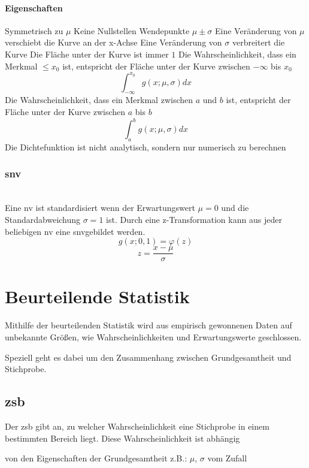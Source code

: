 \documentclass{school}
\begin{document}
\paragraph{Eigenschaften}
\begin{outline}
\1 Symmetrisch zu $\mu$
\1 Keine Nullstellen
 Wendepunkte \quad $\mu \pm \sigma$
\1 Eine Veränderung von $\mu$ verschiebt die Kurve an der x-Achse
\1 Eine Veränderung von $\sigma$ verbreitert die Kurve
\1 Die Fläche unter der Kurve ist immer $1$
\1 Die Wahrscheinlichkeit, dass ein Merkmal $\leqslant x_0$ ist, entspricht der Fläche unter der Kurve zwischen $-\infty$ bis $x_0$
$$\int_{-\infty}^{x_0}g(x;\mu,\sigma)dx$$
\1 Die Wahrscheinlichkeit, dass ein Merkmal zwischen $a$ und $b$ ist, entspricht der Fläche unter der Kurve zwischen $a$ bis $b$
$$\int_{a}^{b}g(x;\mu,\sigma)dx$$
\1 Die Dichtefunktion ist nicht analytisch, sondern nur numerisch zu berechnen
\end{outline}

\subsubsection{\gls{snv}}~\\
Eine \gls{nv} ist standardisiert wenn der Erwartungswert $\mu = 0$ und die Standardabweichung $\sigma = 1$ ist. Durch eine z-Transformation kann aus jeder beliebigen \gls{nv} eine \gls{snv}gebildet werden.
$$g(x;0,1) = \varphi(z)$$
$$z = \frac{x-\mu}{\sigma}$$

\newpage
\section{Beurteilende Statistik}
Mithilfe der beurteilenden Statistik wird aus empirisch gewonnenen Daten auf unbekannte Größen, wie Wahrscheinlichkeiten und Erwartungswerte geschlossen.

Speziell geht es dabei um den Zusammenhang zwischen Grundgesamtheit und Stichprobe.

\subsection{\gls{zsb}}
Der \gls{zsb} gibt an, zu welcher Wahrscheinlichkeit eine Stichprobe in einem bestimmten Bereich liegt. Diese Wahrscheinlichkeit ist abhängig
\begin{outline}
\1 von den Eigenschaften der Grundgesamtheit
	\2 z.B.: $\mu$, $\sigma$
\1 vom Zufall
\end{outline}
\end{document}
